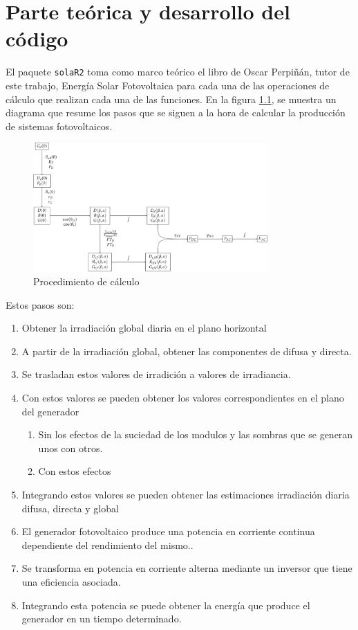 \chapter{Parte teórica y desarrollo del código}
\label{chap:parte-teorica-desarrollo-código}
El paquete \texttt{solaR2} toma como marco teórico el libro de Oscar Perpiñán, tutor de este trabajo, Energía Solar Fotovoltaica \cite{Perpinan2023} para cada una de las operaciones de cálculo que realizan cada una de las funciones.
En la figura \ref{fig:org3307b21}, se muestra un diagrama que resume los pasos que se siguen a la hora de calcular la producción de sistemas fotovoltaicos.
\begin{figure}[]
\centering
\includegraphics[keepaspectratio,width=0.8\textwidth,height=0.5\textheight]{figuras/ProcedimientoCalculoRadiacionInclinada.pdf}
\caption{\label{fig:org3307b21}Procedimiento de cálculo}
\end{figure}
Estos pasos son:
\begin{enumerate}
\item Obtener la irradiación global diaria en el plano horizontal
\item A partir de la irradiación global, obtener las componentes de difusa y directa.
\item Se trasladan estos valores de irradición a valores de irradiancia.
\item Con estos valores se pueden obtener los valores correspondientes en el plano del generador
\begin{enumerate}
\item Sin los efectos de la suciedad de los modulos y las sombras que se generan unos con otros.
\item Con estos efectos
\end{enumerate}
\item Integrando estos valores se pueden obtener las estimaciones irradiación diaria difusa, directa y global
\item El generador fotovoltaico produce una potencia en corriente continua dependiente del rendimiento del mismo..
\item Se transforma en potencia en corriente alterna mediante un inversor que tiene una eficiencia asociada.
\item Integrando esta potencia se puede obtener la energía que produce el generador en un tiempo determinado.
\end{enumerate}

